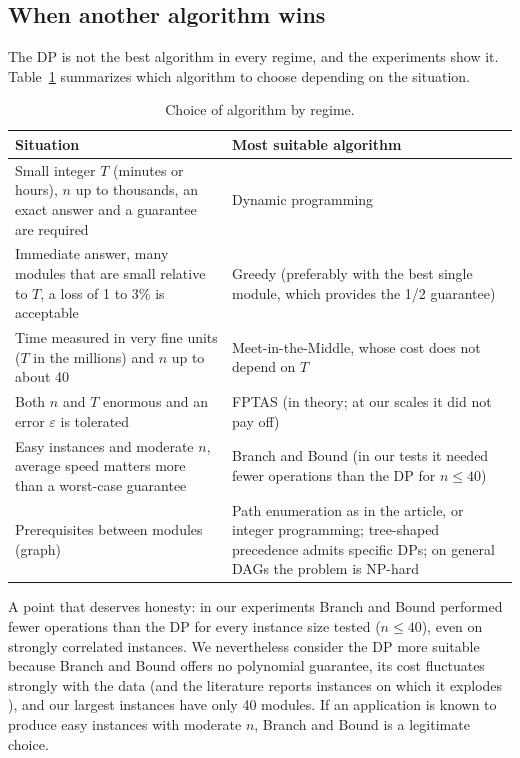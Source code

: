 \subsection{When another algorithm wins}

The DP is not the best algorithm in every regime, and the experiments show it. Table~\ref{tab:decision} summarizes which algorithm to choose depending on the situation.

\begin{table}[h]
\centering
\caption{Choice of algorithm by regime.}\label{tab:decision}
\small
\begin{tabularx}{\linewidth}{@{}X X@{}}
\toprule
Situation & Most suitable algorithm\\
\midrule
Small integer $T$ (minutes or hours), $n$ up to thousands, an exact answer and a guarantee are required & Dynamic programming\\
Immediate answer, many modules that are small relative to $T$, a loss of 1 to 3\% is acceptable & Greedy (preferably with the best single module, which provides the 1/2 guarantee)\\
Time measured in very fine units ($T$ in the millions) and $n$ up to about 40 & Meet-in-the-Middle, whose cost does not depend on $T$\\
Both $n$ and $T$ enormous and an error $\varepsilon$ is tolerated & FPTAS (in theory; at our scales it did not pay off)\\
Easy instances and moderate $n$, average speed matters more than a worst-case guarantee & Branch and Bound (in our tests it needed fewer operations than the DP for $n\le40$)\\
Prerequisites between modules (graph) & Path enumeration as in the article, or integer programming; tree-shaped precedence admits specific DPs; on general DAGs the problem is NP-hard \cite{samphaiboon2000}\\
\bottomrule
\end{tabularx}
\end{table}

A point that deserves honesty: in our experiments Branch and Bound performed fewer operations than the DP for every instance size tested ($n\le40$), even on strongly correlated instances. We nevertheless consider the DP more suitable because Branch and Bound offers no polynomial guarantee, its cost fluctuates strongly with the data (and the literature reports instances on which it explodes \cite{pisinger2005}), and our largest instances have only 40 modules. If an application is known to produce easy instances with moderate $n$, Branch and Bound is a legitimate choice.

